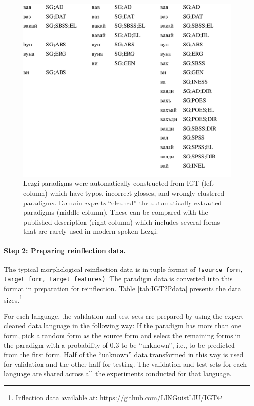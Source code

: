 \begin{figure}[!tb]
    \centering
    \includegraphics[width=15cm]{figs/LezgiParadigms.pdf}
    \caption[Noisy to Clean Paradigms]{Lezgi paradigms were automatically constructed from IGT (left column) which have typos, incorrect glosses, and wrongly clustered paradigms. Domain experts ``cleaned'' the automatically extracted paradigms (middle column). These can be compared with the published description (right column) which includes several forms that are rarely used in modern spoken Lezgi.}
    \label{fig:cleaning}
\end{figure}

\paragraph{Step 2: Preparing reinflection data.}
The typical morphological reinflection data is in tuple format of \texttt{(source form, target form, target features)}. The paradigm data is converted into this format in preparation for reinflection. Table \ref{tab:IGT2Pdata} presents the data sizes.\footnote{Inflection data available at: \url{https://github.com/LINGuistLIU/IGT}} 

For each language, the validation and test sets are prepared by using the expert-cleaned data language in the following way: If the paradigm has more than one form, pick a random form as the source form and select the remaining forms in the paradigm with a probability of 0.3 to be ``unknown'', i.e., to be predicted from the first form. Half of the ``unknown'' data transformed in this way is used for validation and the other half for testing. The validation and test sets for each language are shared across all the experiments conducted for that language.

